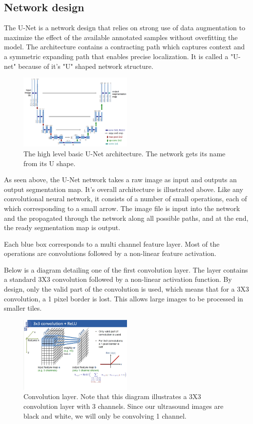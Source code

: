 \documentclass[letterpaper]{article}
\begin{document}
\subsection{Network design}
The U-Net is a network design that relies on strong use of data augmentation to maximize the effect of the available annotated samples without overfitting the model. The architecture contains a contracting path which captures context and a symmetric expanding path that enables precise localization. It is called a "U-net" because of it's "U" shaped network structure.


 \begin{figure}[H]
  \centerline{\includegraphics[width=0.5\textwidth]{Images/UNET.png}}
  \caption{The high level basic U-Net architecture. The network gets its name from its U shape.}
  \label{fig:unet}
\end{figure}

As seen above, the U-Net network takes a raw image as input and outputs an output segmentation map. 
It's overall architecture is illustrated above. Like any convolutional neural network, it consists of a number of small operations, each of which corresponding to a small arrow. The image file is input into the network and the propagated through the network along all possible paths,  and at the end, the ready segmentation map is output.

Each blue box corresponds to a multi channel feature layer. Most of the operations are convolutions followed by a non-linear feature activation. 

Below is a diagram detailing one of the first convolution layer. The layer contains a standard 3X3 convolution followed by a non-linear activation function. By design, only the valid part of the convolution is used, which means that for a 3X3 convolution, a 1 pixel border is lost. This allows large images to be processed in smaller tiles. 	

 \begin{figure}[H]
  \centerline{\includegraphics[width=0.5\textwidth]{Images/UNET1.png}}
  \caption{Convolution layer. Note that this diagram illustrates a 3X3 convolution layer with 3 channels. Since our ultrasound images are black and white, we will only be convolving 1 channel.}
  \label{fig:unet1}
\end{figure}
\end{document}
